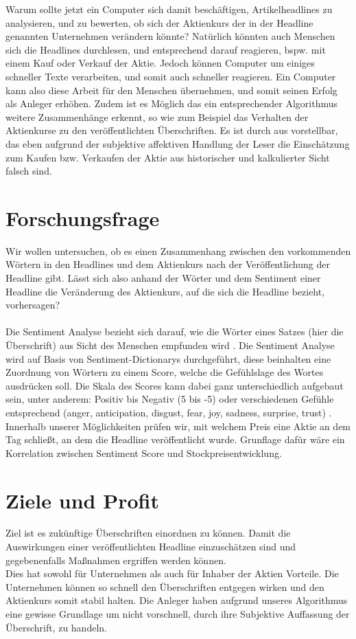 Warum sollte jetzt ein Computer sich damit beschäftigen, Artikelheadlines zu analysieren, und zu bewerten, ob sich der Aktienkurs der in der Headline genannten Unternehmen verändern könnte? Natürlich könnten auch Menschen sich die Headlines durchlesen, und entsprechend darauf reagieren, bspw. mit einem Kauf oder Verkauf der Aktie. Jedoch können Computer um einiges schneller Texte verarbeiten, und somit auch schneller reagieren. Ein Computer kann also diese Arbeit für den Menschen übernehmen, und somit seinen Erfolg als Anleger erhöhen. Zudem ist es Möglich das ein entsprechender Algorithmus weitere Zusammenhänge erkennt, so wie zum Beispiel das Verhalten der Aktienkurse zu den veröffentlichten Überschriften. Es ist durch aus vorstellbar, das eben aufgrund der subjektive affektiven Handlung der Leser die Einschätzung zum Kaufen bzw. Verkaufen der Aktie aus historischer und kalkulierter Sicht falsch sind.

\section*{Forschungsfrage}
Wir wollen untersuchen, ob es einen Zusammenhang zwischen den vorkommenden Wörtern in den Headlines und dem Aktienkurs nach der Veröffentlichung der Headline gibt. Lässt sich also anhand der Wörter und dem Sentiment einer Headline die Veränderung des Aktienkurs, auf die sich die Headline bezieht, vorhersagen?\\ \\
Die Sentiment Analyse bezieht sich darauf, wie die Wörter eines Satzes (hier die Überschrift) aus Sicht des Menschen empfunden wird \citep[vgl.][]{agarwel2016}. Die Sentiment Analyse wird auf Basis von Sentiment-Dictionarys durchgeführt, diese beinhalten eine Zuordnung von Wörtern zu einem Score, welche die Gefühlslage des Wortes ausdrücken soll. Die Skala des Scores kann dabei ganz unterschiedlich aufgebaut sein, unter anderem: Positiv bis Negativ (5 bis -5) \citep{afinn} oder verschiedenen Gefühle entsprechend (anger, anticipation, disgust, fear, joy, sadness, surprise, trust) \citep{nrc}.
Innerhalb unserer Möglichkeiten prüfen wir, mit welchem Preis eine Aktie an dem Tag schließt, an dem die Headline veröffentlicht wurde. Grunflage dafür wäre ein Korrelation zwischen Sentiment Score und Stockpreisentwicklung.
\section*{Ziele und Profit}
Ziel ist es zukünftige Überschriften einordnen zu können. Damit die Auswirkungen einer veröffentlichten Headline einzuschätzen sind und gegebenenfalls Maßnahmen ergriffen werden können. \\
Dies hat sowohl für Unternehmen als auch für Inhaber der Aktien Vorteile. Die Unternehmen können so schnell den Überschriften entgegen wirken und den Aktienkurs somit stabil halten. Die Anleger haben aufgrund unseres Algorithmus eine gewisse Grundlage um nicht vorschnell, durch ihre Subjektive Auffassung der Überschrift, zu handeln.

